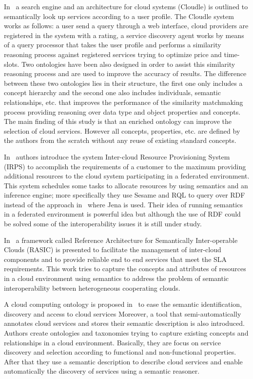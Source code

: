 In~\cite{cloudle} a search engine and an architecture for cloud systems (Cloudle) is 
outlined to semantically look up services according to a user profile. The 
Cloudle system works as follows: a user send a query through a web interface, 
cloud providers are registered in the system with a rating, a service discovery 
agent works by means of a query processor that takes the user profile and 
performs a similarity reasoning process against registered services trying to 
optimize price and time-slots. Two ontologies have been also designed in order to 
assist this similarity reasoning process and are used to improve the accuracy of 
results. The difference between these two ontologies lies in their structure, 
the first one only includes a concept hierarchy and the second one also includes 
individuals, semantic relationships, etc. that improves the performance of the 
similarity matchmaking process providing reasoning over data type and object 
properties and concepts. The main finding of this study is that an enriched 
ontology can improve the selection of cloud services. However all concepts, 
properties, etc. are defined by the authors from the scratch without any reuse 
of existing standard concepts.

In~\cite{6206823} authors introduce the system Inter-cloud Resource Provisioning System 
(IRPS) to accomplish the requirements of a customer to the maximum providing 
additional resources to the cloud system participating in a federated 
environment. This system schedules some tasks to allocate resources by using 
semantics and an inference engine; more specifically they use Sesame and RQL to 
query over RDF instead of the approach in~\cite{Ejarque:2008:USR:1443230.1444322} where Jena is used. Their idea of 
running semantics in a federated environment is powerful idea but although the 
use of RDF could be solved some of the interoperability issues it is still under 
study.


In~\cite{Buyya:2010:IUF:2143583.2143586} a framework called Reference Architecture for Semantically Inter-operable 
Clouds (RASIC) is presented to facilitate the management of inter-cloud 
components and to provide reliable end to end services that meet the SLA 
requirements. This work tries to capture the concepts and attributes of 
resources in a cloud environment using semantics to address the problem of 
semantic interoperability between heterogeneous cooperating clouds.


A cloud computing ontology is proposed in~\cite{secloud12} to ease the semantic 
identification, discovery and access to cloud services Moreover, a tool that 
semi-automatically annotates cloud services and stores their semantic 
description is also introduced. Authors create ontologies and taxonomies trying 
to capture existing concepts and relationships in a cloud environment. 
Basically, they are focus on service discovery and selection according to 
functional and non-functional properties. After that they use a semantic 
description to describe cloud services and enable automatically the discovery of 
services using a semantic reasoner.

